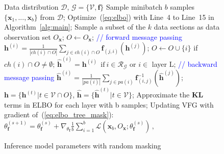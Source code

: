 \documentclass{article}
\begin{document}
 \begin{figure}
\begin{minipage}{0.55\textwidth}
\begin{algorithm}[H]
   \caption{Inference model parameters with random masking}
   \label{alg:rand_mask}
\begin{algorithmic}[1]
    Data distribution $\mathcal{D}$,  $\mathcal{G} = \{\mathcal{V}, \mathbf{f}\}$
   \STATE  Sample minibatch $b$ samples $\{\mathbf{x}_1, ..., \mathbf{x}_b \}$ from $\mathcal{D}$;
   \STATE  
    Optimize~(\ref{eq:elbo}) with Line~4 to Line~15 in Algorithm~\ref{alg:main};
    \STATE  Sample a subset of the $k$ data sections as data observation set $O_{\mathbf{x}}$; $O \leftarrow O_{\mathbf{x}}$;
    \STATE  \textcolor{blue}{// forward message passing}
   \STATE $\mathbf{h}^{(i)} = \frac{1}{|ch(i) \cap O |} \sum_{j \in ch(i) \cap O} \mathbf{f}_{(j,i)}(\mathbf{h}^{(j)})$; 
     \STATE  $O \leftarrow O \cup \{i\}$ if $ch(i) \cap O \neq \emptyset $; 
    \ENDFOR
    \STATE $\widehat{\mathbf{h}}^{(i)} = \mathbf{h}^{(i)} \ \  \text{if} \ i \in \mathcal{R}_{\mathcal{G}} $ or $i \in$ layer L;
   \STATE \textcolor{blue}{// backward message passing}
   \STATE $\widehat{\mathbf{h}}^{(i)} = \frac{1}{|pa(i)|} \sum_{j \in pa(i) } \mathbf{f}^{-1}_{ (i,j)}(\widehat{\mathbf{h}}^{(j)}) $;%
   \ENDFOR
    \STATE  $\mathbf{h} =  \{\mathbf{h}^{(t)} \big |  t \in \mathcal{V} \cap O \}$, $\widehat{\mathbf{h}} =  \{\widehat{\mathbf{h}}^{(t)} \big | t \in \mathcal{V} \}$;
    \STATE Approximate the $\mathbf{KL}$ terms in ELBO for each layer with b samples;
    \STATE Updating VFG with gradient of~(\ref{eq:elbo_tree_mask}): $\theta^{(s+1)}_{\mathbf{f}} = \theta^{(s)}_{\mathbf{f}} + \nabla_{\theta_{\mathbf{f}}}\frac{1}{b} \sum_{i=1}^b  \mathcal{L}(\mathbf{x}_b, O_{\mathbf{x}}; \theta^{(s)}_{\mathbf{f}})   \, ,$
   \ENDFOR
\end{algorithmic}
\end{algorithm}
\end{minipage}
 \vspace{-0.3in}
\end{figure}
\vspace{-0.3in}
\end{document}

